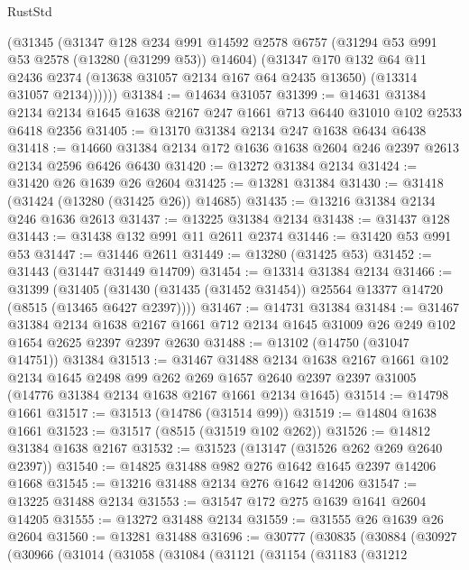 \begin{lexlean}{RustStd}
\begin{coremodule}
        (@31345
          (@31347
            @128
            @234
            @991
            @14592
            @2578
            @6757
            (@31294 @53 @991 @53 @2578 (@13280 (@31299 @53)) @14604)
            (@31347
              @170
              @132
              @64
              @11
              @2436
              @2374
              (@13638 @31057 @2134 @167 @64 @2435 @13650)
              (@13314 @31057 @2134))))))
@31384 := @14634 @31057
@31399 := @14631
    @31384
    @2134
    @2134
    @1645
    @1638
    @2167
    @247
    @1661
    @713
    @6440
    @31010
    @102
    @2533
    @6418
    @2356
@31405 := @13170 @31384 @2134 @247 @1638 @6434 @6438
@31418 := @14660 @31384 @2134 @172 @1636 @1638 @2604 @246 @2397 @2613 @2134 @2596 @6426 @6430
@31420 := @13272 @31384 @2134
@31424 := @31420 @26 @1639 @26 @2604
@31425 := @13281 @31384
@31430 := @31418 (@31424 (@13280 (@31425 @26)) @14685)
@31435 := @13216 @31384 @2134 @246 @1636 @2613
@31437 := @13225 @31384 @2134
@31438 := @31437 @128
@31443 := @31438 @132 @991 @11 @2611 @2374
@31446 := @31420 @53 @991 @53
@31447 := @31446 @2611
@31449 := @13280 (@31425 @53)
@31452 := @31443 (@31447 @31449 @14709)
@31454 := @13314 @31384 @2134
@31466 := @31399
    (@31405 (@31430 (@31435 (@31452 @31454)) @25564 @13377 @14720 (@8515 (@13465 @6427 @2397))))
@31467 := @14731 @31384
@31484 := @31467
    @31384
    @2134
    @1638
    @2167
    @1661
    @712
    @2134
    @1645
    @31009
    @26
    @249
    @102
    @1654
    @2625
    @2397
    @2397
    @2630
@31488 := @13102 (@14750 (@31047 @14751)) @31384
@31513 := @31467
    @31488
    @2134
    @1638
    @2167
    @1661
    @102
    @2134
    @1645
    @2498
    @99
    @262
    @269
    @1657
    @2640
    @2397
    @2397
    @31005
    (@14776 @31384 @2134 @1638 @2167 @1661 @2134 @1645)
@31514 := @14798 @1661
@31517 := @31513 (@14786 (@31514 @99))
@31519 := @14804 @1638 @1661
@31523 := @31517 (@8515 (@31519 @102 @262))
@31526 := @14812 @31384 @1638 @2167
@31532 := @31523 (@13147 (@31526 @262 @269 @2640 @2397))
@31540 := @14825 @31488 @982 @276 @1642 @1645 @2397 @14206 @1668
@31545 := @13216 @31488 @2134 @276 @1642 @14206
@31547 := @13225 @31488 @2134
@31553 := @31547 @172 @275 @1639 @1641 @2604 @14205
@31555 := @13272 @31488 @2134
@31559 := @31555 @26 @1639 @26 @2604
@31560 := @13281 @31488
@31696 := @30777
    (@30835
      (@30884
        (@30927
          (@30966
            (@31014
              (@31058
                (@31084
                  (@31121
                    (@31154
                      (@31183
                        (@31212

\end{coremodule}
\end{lexlean}
